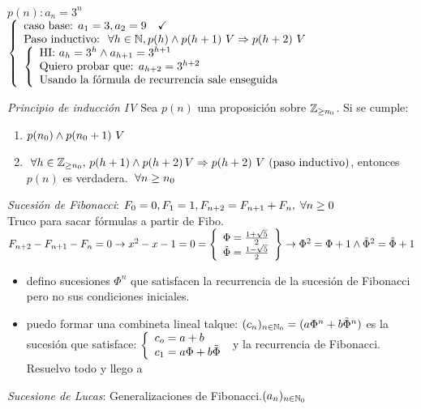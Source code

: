 $p(n): a_n = 3^n$\\

$\llave{l}{
		\text{caso base: } a_1 = 3, a_2 =9 \Tilde\\
		\text{Paso inductivo: } \paratodo h \en \naturales, p(h) \y p(h+1) \ V \entonces p(h+2)\ V\\

		\llave{l}{
			\text{HI: }  a_h = 3^h \y a_{h+1} = 3^{h+1}\\
			\text{Quiero probar que: } a_{h+2}= 3^{h+2}\\
			\text{Usando la fórmula de recurrencia sale enseguida}
		}
	}
$

\textit{Principio de inducción IV } Sea $p(n)$ una proposición sobre $\enteros_{\geq n_0}$. Si se cumple:
\begin{enumerate}
	\item  $p(n_0) \y p(n_0 + 1) \ V$
	\item $\paratodo h \en \enteros_{\geq n_0},\, p(h+1) \y p(h+2)\, V \entonces p(h+2)\ V\ (\text{paso inductivo})$,
	      entonces $p(n)$ es verdadera. $\paratodo n \geq n_0$\\
\end{enumerate}


\textit{Sucesión de Fibonacci}: $F_0 = 0, F_1 = 1, F_{n+2} = F_{n+1} + F_n, \paratodo n \geq 0$\\
Truco para sacar fórmulas a partir de Fibo.\\
$F_{n+2} - F_{n+1} - F_n = 0 \to x^2 - x -1 = 0 =
	\llaves{ l }{
		\Phi = \frac{1+\sqrt{5}}{2}\\
		\tilde\Phi = \frac{1-\sqrt{5}}{2}\\
	} \to \Phi^2 = \Phi + 1 \y \tilde\Phi^2  =\tilde\Phi + 1 $
\begin{itemize}
	\item  defino sucesiones $\Phi^n$ que satisfacen la recurrencia de la sucesión de Fibonacci pero no sus condiciones iniciales.
	\item puedo formar una combineta lineal talque: $(c_n)_{n\en \naturales_0} = (a\Phi^n + b\tilde\Phi^n)$ es la sucesión que satisface:
	      $\llave{ l }{
			      c_o = a+b\\
			      c_1 = a\Phi + b\tilde\Phi
		      }$ y la recurrencia de Fibonacci.\\
	      Resuelvo todo y llego a $\boxed{}$
\end{itemize}

\textit{Sucesione de Lucas}: Generalizaciones de Fibonacci.$(a_n)_{n\in\naturales_0}$\\

